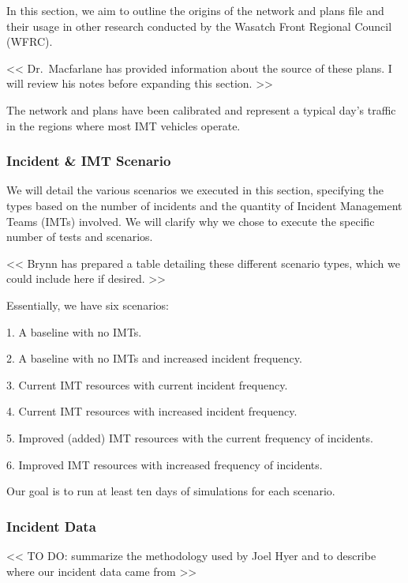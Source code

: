\documentclass[
  letterpaper,
  authoryear]{elsarticle}
\begin{document}
In this section, we aim to outline the origins of the network and plans
file and their usage in other research conducted by the Wasatch Front
Regional Council (WFRC).

\textless\textless{} Dr.~Macfarlane has provided information about the
source of these plans. I will review his notes before expanding this
section. \textgreater\textgreater{}

The network and plans have been calibrated and represent a typical day's
traffic in the regions where most IMT vehicles operate.

\hypertarget{incident-imt-scenario}{%
\subsubsection{Incident \& IMT Scenario}\label{incident-imt-scenario}}

We will detail the various scenarios we executed in this section,
specifying the types based on the number of incidents and the quantity
of Incident Management Teams (IMTs) involved. We will clarify why we
chose to execute the specific number of tests and scenarios.

\textless\textless{} Brynn has prepared a table detailing these
different scenario types, which we could include here if desired.
\textgreater\textgreater{}

Essentially, we have six scenarios:

1. A baseline with no IMTs.

2. A baseline with no IMTs and increased incident frequency.

3. Current IMT resources with current incident frequency.

4. Current IMT resources with increased incident frequency.

5. Improved (added) IMT resources with the current frequency of
incidents.

6. Improved IMT resources with increased frequency of incidents.

Our goal is to run at least ten days of simulations for each scenario.

\hypertarget{incident-data}{%
\subsubsection{Incident Data}\label{incident-data}}

\textless\textless{} TO DO: summarize the methodology used by Joel Hyer
and to describe where our incident data came from
\textgreater\textgreater{}
\end{document}
